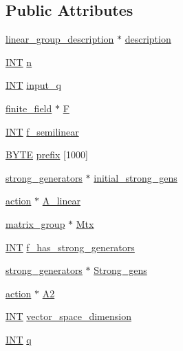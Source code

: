 \subsection*{Public Attributes}
\begin{DoxyCompactItemize}
\item 
\mbox{\hyperlink{classlinear__group__description}{linear\+\_\+group\+\_\+description}} $\ast$ \mbox{\hyperlink{classlinear__group_a47e009be6b4fc693c847a260a08ace59}{description}}
\item 
\mbox{\hyperlink{galois_8h_a09fddde158a3a20bd2dcadb609de11dc}{I\+NT}} \mbox{\hyperlink{classlinear__group_ae29031b3dcbcd12ba302c7d7386f7d41}{n}}
\item 
\mbox{\hyperlink{galois_8h_a09fddde158a3a20bd2dcadb609de11dc}{I\+NT}} \mbox{\hyperlink{classlinear__group_a0deb115188f7566a7d1f89736a6b978b}{input\+\_\+q}}
\item 
\mbox{\hyperlink{classfinite__field}{finite\+\_\+field}} $\ast$ \mbox{\hyperlink{classlinear__group_a1aabfba7951f0f69281b176e5ce09b9c}{F}}
\item 
\mbox{\hyperlink{galois_8h_a09fddde158a3a20bd2dcadb609de11dc}{I\+NT}} \mbox{\hyperlink{classlinear__group_addf4a752ae44b3e3cb65619e36d9897e}{f\+\_\+semilinear}}
\item 
\mbox{\hyperlink{galois_8h_ab6cc7b4aeb6ea31aba2b3fbfc83ff5e6}{B\+Y\+TE}} \mbox{\hyperlink{classlinear__group_a6f01632d65bb3445f75113a32597908a}{prefix}} \mbox{[}1000\mbox{]}
\item 
\mbox{\hyperlink{classstrong__generators}{strong\+\_\+generators}} $\ast$ \mbox{\hyperlink{classlinear__group_a2d57dd65427014a306f8a1298f1934f3}{initial\+\_\+strong\+\_\+gens}}
\item 
\mbox{\hyperlink{classaction}{action}} $\ast$ \mbox{\hyperlink{classlinear__group_a5f823208795d62f799c36255fadc1ac3}{A\+\_\+linear}}
\item 
\mbox{\hyperlink{classmatrix__group}{matrix\+\_\+group}} $\ast$ \mbox{\hyperlink{classlinear__group_a8d0a7970753b3a81d647a1086d148c27}{Mtx}}
\item 
\mbox{\hyperlink{galois_8h_a09fddde158a3a20bd2dcadb609de11dc}{I\+NT}} \mbox{\hyperlink{classlinear__group_aaa1404a6dbc657c8103e4bbfb1204178}{f\+\_\+has\+\_\+strong\+\_\+generators}}
\item 
\mbox{\hyperlink{classstrong__generators}{strong\+\_\+generators}} $\ast$ \mbox{\hyperlink{classlinear__group_ab72248e25d5d732eae3dfe574a28dbab}{Strong\+\_\+gens}}
\item 
\mbox{\hyperlink{classaction}{action}} $\ast$ \mbox{\hyperlink{classlinear__group_a436d7238ca25fa9af7c91836e9c5cc7e}{A2}}
\item 
\mbox{\hyperlink{galois_8h_a09fddde158a3a20bd2dcadb609de11dc}{I\+NT}} \mbox{\hyperlink{classlinear__group_ae82156504b4041a90a3c7f759f2322ea}{vector\+\_\+space\+\_\+dimension}}
\item 
\mbox{\hyperlink{galois_8h_a09fddde158a3a20bd2dcadb609de11dc}{I\+NT}} \mbox{\hyperlink{classlinear__group_a9e26bc5292b1b1037a8cbd234eb0d998}{q}}
\end{DoxyCompactItemize}


